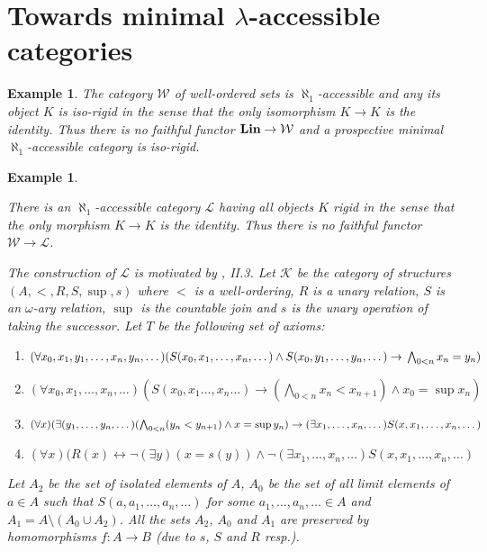 \documentclass[12pt]{amsart}
\newtheorem{exam}[theo]{Example}
\newcommand\Lin{\operatorname{\bf Lin}}
\newcommand\ck{\mathcal {K}}
\newcommand\cl{\mathcal {L}}
\newcommand\cw{\mathcal {W}}
\begin{document}
\section{Towards minimal $\lambda$-accessible categories}

\begin{exam}\label{re4,2}
{
\em
The category $\cw$ of well-ordered sets is $\aleph_1$-accessible and any its object $K$ is iso-rigid in the sense that the only isomorphism
$K\to K$ is the identity. Thus there is no faithful functor $\Lin\to\cw$ and a prospective minimal $\aleph_1$-accessible category is iso-rigid.
}
\end{exam}

\begin{exam}\label{hpt}
{
\em
There is an $\aleph_1$-accessible category $\cl$ having all objects $K$ rigid in the sense that the only morphism $K\to K$ is the identity. Thus there is no faithful functor $\cw\to\cl$.

The construction of $\cl$ is motivated by \cite{HPT}, II.3. Let $\ck$ be the category of structures $(A,<,R,S,\sup,s)$ where $<$ is a well-ordering, 
$R$ is a unary relation, $S$ is an $\omega$-ary relation, $\sup$ is the countable join and $s$ is the unary operation of taking the successor. 
Let $T$ be the following set of axioms:
\begin{enumerate}
\item $(\forall x_0,x_1,y_1,\dots,x_n,y_n,\dots)(S(x_0,x_1,\dots,x_n,\dots)\wedge S(x_0,y_1,\dots,y_n,\dots)\to \newline\bigwedge_{0<n}x_n=y_n)$

\item $(\forall x_0,x_1,\dots,x_n,\dots)(S(x_0,x_1\dots,x_n\dots)\to(\bigwedge_{0<n}x_n<x_{n+1})\wedge x_0=\sup x_n)$

\item $(\forall x)(\exists(y_1,\dots,y_n,\dots)(\bigwedge_{0<n}(y_n<y_{n+1})\wedge x=\sup y_n)\newline \to(\exists x_1,\dots,x_n,\dots)S(x,x_1,\dots,x_n,\dots)$
       
\item $(\forall x)(R(x)\leftrightarrow \neg(\exists y)(x=s(y))\wedge \neg(\exists x_1,\dots,x_n,\dots)S(x,x_1,\dots,x_n,\dots)$
\end{enumerate}
Let $A_2$ be the set of isolated elements of $A$, $A_0$ be the set of all limit elements of $a\in A$ such that $S(a,a_1,\dots,a_n,\dots)$ for some
$a_1,\dots,a_n,\dots\in A$ and $A_1=A\setminus (A_0\cup A_2)$. All the sets $A_2$, $A_0$ and $A_1$ are preserved by homomorphisms $f:A\to B$
(due to $s$, $S$ and $R$ resp.).  

}
\end{exam}
\end{document}
